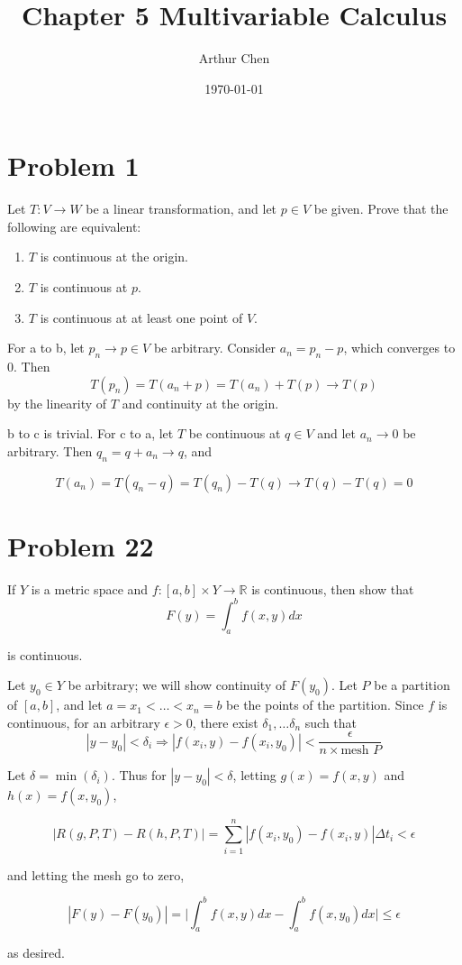 \documentclass{article}
\author{Arthur Chen}
\title{Chapter 5 Multivariable Calculus}
\date{\today}
\newcommand{\R}{\mathbb{R}}
\begin{document}
\maketitle

\section*{Problem 1}

Let $T: V \rightarrow W$ be a linear transformation, and let $p \in V$ be given. Prove that the following are equivalent:

\begin{enumerate}[label=(\alph*)]
\item $T$ is continuous at the origin.
\item $T$ is continuous at $p$.
\item $T$ is continuous at at least one point of $V$.
\end{enumerate}

For a to b, let $p_n \rightarrow p \in V$ be arbitrary. Consider $a_n  = p_n - p$, which converges to $0$. Then
\[
T(p_n) = T(a_n + p) = T(a_n) + T(p) \rightarrow T(p)
\]
by the linearity of $T$ and continuity at the origin.

b to c is trivial. For c to a, let $T$ be continuous at $q \in V$ and let $a_n \rightarrow 0$ be arbitrary. Then $q_n = q + a_n \rightarrow q$, and

\[
T(a_n) = T(q_n - q) = T(q_n) - T(q) \rightarrow T(q)-T(q) = 0
\]

\section*{Problem 22}

If $Y$ is a metric space and $f:[a, b] \times Y \rightarrow \R$ is continuous, then show that
\[
F(y) = \int_a^b f(x, y)dx
\]

is continuous.

Let $y_0 \in Y$ be arbitrary; we will show continuity of $F(y_0)$. Let $P$ be a partition of $[a, b]$, and let $a = x_1 < \dots < x_n = b$ be the points of the partition. Since $f$ is continuous, for an arbitrary $\epsilon > 0$, there exist $\delta_1, \dots \delta_n$ such that
\[
|y-y_0| < \delta_i \Rightarrow |f(x_i, y) - f(x_i, y_0)| < \frac{\epsilon}{n \times \text{mesh }P}
\]

Let $\delta = \min(\delta_i)$. Thus for $|y - y_0| < \delta$, letting $g(x) = f(x, y)$ and $h(x) = f(x, y_0)$,

\[
|R(g, P, T) - R(h, P, T)| = \sum_{i=1}^n|f(x_i, y_0) - f(x_i, y)|\Delta t_i < \epsilon
\]

and letting the mesh go to zero,

\[
|F(y) - F(y_0)| = \bigg| \int_a^bf(x,y)dx - \int_a^bf(x, y_0)dx \bigg| \leq \epsilon
\]

as desired.
\end{document}
